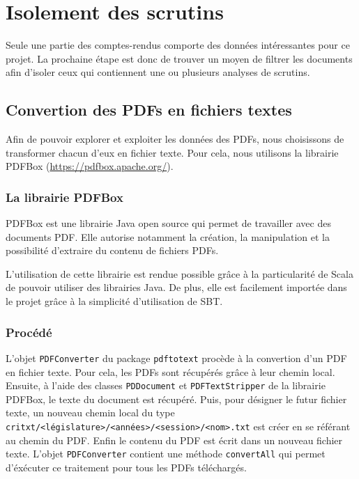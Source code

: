 \section{Isolement des scrutins}

Seule une partie des comptes-rendus comporte des données intéressantes pour ce projet. La prochaine étape est donc de trouver un moyen de filtrer les documents afin d'isoler ceux qui contiennent une ou plusieurs analyses de scrutins.

\subsection{Convertion des PDFs en fichiers textes}

Afin de pouvoir explorer et exploiter les données des PDFs, nous choisissons de transformer chacun d'eux en fichier texte. Pour cela, nous utilisons la librairie PDFBox (\url{https://pdfbox.apache.org/}).

\subsubsection{La librairie PDFBox}

PDFBox est une librairie Java open source qui permet de travailler avec des documents PDF. Elle autorise notamment la création, la manipulation et la possibilité d'extraire du contenu de fichiers PDFs.

L'utilisation de cette librairie est rendue possible grâce à la particularité de Scala de pouvoir utiliser des librairies Java. De plus, elle est facilement importée dans le projet grâce à la simplicité d'utilisation de SBT.

\subsubsection{Procédé}

L'objet \verb|PDFConverter| du package \verb|pdftotext| procède à la convertion d'un PDF en fichier texte.\newline
Pour cela, les PDFs sont récupérés grâce à leur chemin local. Ensuite, à l'aide des classes \verb|PDDocument| et \verb|PDFTextStripper| de la librairie PDFBox, le texte du document est récupéré. Puis, pour désigner le futur fichier texte, un nouveau chemin local du type  \verb|critxt/<législature>/<années>/<session>/<nom>.txt| est créer en se référant au chemin du PDF. Enfin le contenu du PDF est écrit dans un nouveau fichier texte. L'objet \verb|PDFConverter| contient une méthode \verb|convertAll| qui permet d'éxécuter ce traitement pour tous les PDFs téléchargés.

